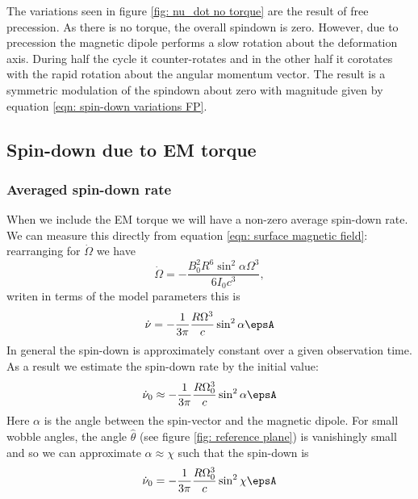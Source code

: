 \documentclass[/home/greg/Thesis/main/main.tex]{subfiles}
\begin{document}
The variations seen in figure \ref{fig: nu_dot no torque} are the result of
free precession. As there is no torque, the overall spindown is zero. However,
due to precession the magnetic dipole performs a slow rotation about the
deformation axis. During half the cycle it counter-rotates and in the other
half it corotates with the rapid rotation about the angular momentum vector.
The result is a symmetric modulation of the spindown about zero with magnitude
given by equation \eqref{eqn: spin-down variations FP}.

\subsection{Spin-down due to EM torque}
\subsubsection{Averaged spin-down rate}
When we include the EM torque we will have a non-zero average spin-down rate. 
We can measure this directly from equation \eqref{eqn: surface magnetic field}:
rearranging for $\dot{\Omega}$ we have
\begin{equation}
    \dot{\Omega} = -\frac{B_{0}^{2}R^{6} \sin^{2}\alpha \Omega^{3}}{6I_{0}c^{3}},
\end{equation}
writen in terms of the model parameters this is
\begin{equation}
\dot{\nu} = -\frac{1}{3\pi}\frac{R \Omega^{3}}{c} \sin^{2}\alpha \epsA
\end{equation}
In general the spin-down is approximately constant over a given observation
time. As a result we estimate the spin-down rate by the initial value:
\begin{equation}
    \dot{\nu}_{0} \approx -\frac{1}{3\pi}\frac{R \Omega_{0}^{3}}{c} \sin^{2}\alpha \epsA
    \label{eqn: spin-down initial EM}
\end{equation}
Here $\alpha$ is the angle between the spin-vector and the magnetic dipole. For
small wobble angles, the angle $\hat{\theta}$ (see figure \ref{fig: reference plane})
is vanishingly small and so we can approximate $\alpha \approx \chi$ such that
the spin-down is 
\begin{equation}
    \dot{\nu}_{0} = -\frac{1}{3\pi}\frac{R \Omega_{0}^{3}}{c} \sin^{2}\chi \epsA
    \label{eqn: spin-down initial EM chi}
\end{equation}
\end{document}
